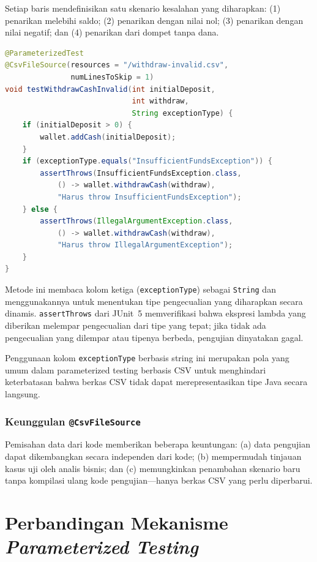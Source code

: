 \documentclass[12pt,a4paper]{article}
\begin{document}
Setiap baris mendefinisikan satu skenario kesalahan yang diharapkan: (1) penarikan
melebihi saldo; (2) penarikan dengan nilai nol; (3) penarikan dengan nilai negatif; dan
(4) penarikan dari dompet tanpa dana.

\begin{lstlisting}[language=Java, caption={Pengujian penarikan tidak valid dengan \texttt{@CsvFileSource}}]
@ParameterizedTest
@CsvFileSource(resources = "/withdraw-invalid.csv",
               numLinesToSkip = 1)
void testWithdrawCashInvalid(int initialDeposit,
                             int withdraw,
                             String exceptionType) {
    if (initialDeposit > 0) {
        wallet.addCash(initialDeposit);
    }
    if (exceptionType.equals("InsufficientFundsException")) {
        assertThrows(InsufficientFundsException.class,
            () -> wallet.withdrawCash(withdraw),
            "Harus throw InsufficientFundsException");
    } else {
        assertThrows(IllegalArgumentException.class,
            () -> wallet.withdrawCash(withdraw),
            "Harus throw IllegalArgumentException");
    }
}
\end{lstlisting}

Metode ini membaca kolom ketiga (\texttt{exceptionType}) sebagai \texttt{String} dan
menggunakannya untuk menentukan tipe pengecualian yang diharapkan secara dinamis.
\texttt{assertThrows} dari JUnit~5 memverifikasi bahwa ekspresi lambda yang diberikan
melempar pengecualian dari tipe yang tepat; jika tidak ada pengecualian yang dilempar
atau tipenya berbeda, pengujian dinyatakan gagal.

Penggunaan kolom \texttt{exceptionType} berbasis string ini merupakan pola yang umum
dalam parameterized testing berbasis CSV untuk menghindari keterbatasan bahwa berkas CSV
tidak dapat merepresentasikan tipe Java secara langsung.

\subsubsection{Keunggulan \texttt{@CsvFileSource}}

Pemisahan data dari kode memberikan beberapa keuntungan: (a) data pengujian dapat
dikembangkan secara independen dari kode; (b) mempermudah tinjauan kasus uji oleh analis
bisnis; dan (c) memungkinkan penambahan skenario baru tanpa kompilasi ulang kode
pengujian---hanya berkas CSV yang perlu diperbarui.

\section{Perbandingan Mekanisme \textit{Parameterized Testing}}
\end{document}
